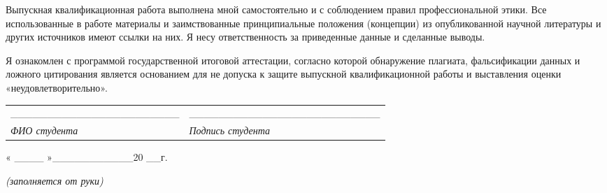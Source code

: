 Выпускная квалификационная работа выполнена мной самостоятельно и с соблюдением правил профессиональной этики. Все использованные в работе материалы и заимствованные принципиальные положения (концепции) из опубликованной научной литературы и других источников имеют ссылки на них. Я несу ответственность за приведенные данные и сделанные выводы.

Я ознакомлен с программой государственной итоговой аттестации, согласно которой обнаружение плагиата, фальсификации данных и ложного цитирования является основанием для не допуска к защите выпускной квалификационной работы и выставления оценки «неудовлетворительно».

{\def\LTcaptype{none} %
\begin{longtable}[]{@{}
  >{\raggedright\arraybackslash}p{}
  >{\raggedright\arraybackslash}p{}@{}}
\toprule\noalign{}
\endhead
\bottomrule\noalign{}
\endlastfoot
\_\_\_\_\_\_\_\_\_\_\_\_\_\_\_\_\_\_\_\_\_\_\_ & \_\_\_\_\_\_\_\_\_\_\_\_\_\_\_\_\_\_\_\_\_\_\_\_\_\_ \\
\emph{ФИО студента} & \emph{Подпись студента} \\
\end{longtable}
}

« \_\_\_\_ »\_\_\_\_\_\_\_\_\_\_\_20 \_\_г.

\emph{(заполняется от руки)}

\section{}\label{section}

\section{}\label{section-1}

\section{}\label{section-2}

\section{}\label{section-3}

\section{}\label{section-4}

